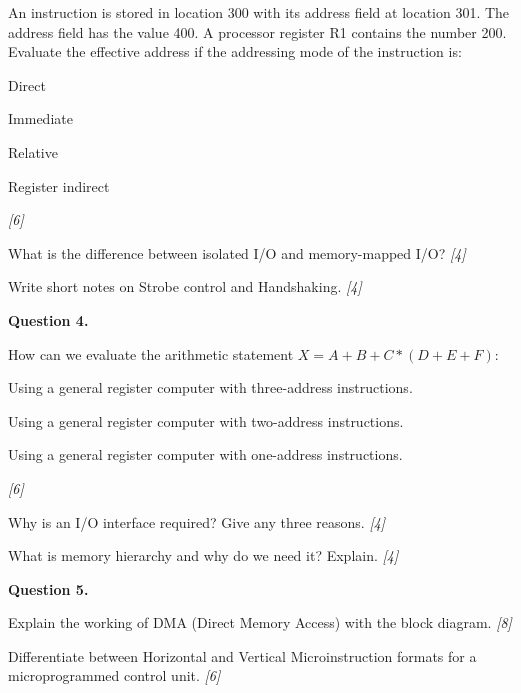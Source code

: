 \documentclass[11pt,a4paper]{article}
\newcommand{\pts}[1]{\hfill   \textit{[#1]}}
\begin{document}
\begin{parts}
  \item An instruction is stored in location 300 with its address field at location 301. The address field has the value 400. A processor register R1 contains the number 200. Evaluate the effective address if the addressing mode of the instruction is:
  
\begin{parts}
    \item Direct
    \item Immediate
    \item Relative
    \item Register indirect
  \end{parts} \pts{6}
  \item What is the difference between isolated I/O and memory-mapped I/O? \pts{4}
  \item Write short notes on Strobe control and Handshaking. \pts{4}
\end{parts}

\medskip


\noindent   \textbf{Question 4.}

\begin{parts}
  \item How can we evaluate the arithmetic statement $X = A+B+C*(D+E+F)$:
  
\begin{parts}
    \item Using a general register computer with three-address instructions.
    \item Using a general register computer with two-address instructions.
    \item Using a general register computer with one-address instructions.
  \end{parts} \pts{6}
  \item Why is an I/O interface required? Give any three reasons. \pts{4}
  \item What is memory hierarchy and why do we need it? Explain. \pts{4}
\end{parts}

\medskip


\noindent   \textbf{Question 5.}

\begin{parts}
  \item Explain the working of DMA (Direct Memory Access) with the block diagram. \pts{8}
  \item Differentiate between Horizontal and Vertical Microinstruction formats for a microprogrammed control unit. \pts{6}
\end{parts}
\end{document}
